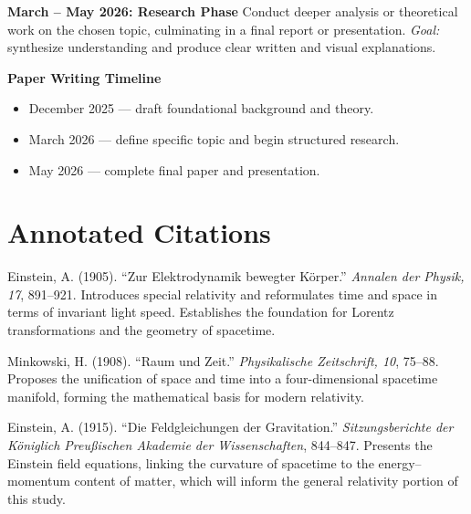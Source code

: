 \documentclass[12pt]{article}
\begin{document}
\textbf{March – May 2026: Research Phase}  
Conduct deeper analysis or theoretical work on the chosen topic, culminating in a final report or presentation.  
\textit{Goal:} synthesize understanding and produce clear written and visual explanations.

\textbf{Paper Writing Timeline}  
\begin{itemize}[leftmargin=2em, itemsep=0.2em]
    \item December 2025 — draft foundational background and theory.
    \item March 2026 — define specific topic and begin structured research.
    \item May 2026 — complete final paper and presentation.
\end{itemize}

\section*{Annotated Citations}

Einstein, A. (1905). “Zur Elektrodynamik bewegter Körper.” \textit{Annalen der Physik, 17}, 891–921.  
Introduces special relativity and reformulates time and space in terms of invariant light speed. Establishes the foundation for Lorentz transformations and the geometry of spacetime.

Minkowski, H. (1908). “Raum und Zeit.” \textit{Physikalische Zeitschrift, 10}, 75–88.  
Proposes the unification of space and time into a four-dimensional spacetime manifold, forming the mathematical basis for modern relativity.

Einstein, A. (1915). “Die Feldgleichungen der Gravitation.” \textit{Sitzungsberichte der Königlich Preußischen Akademie der Wissenschaften}, 844–847.  
Presents the Einstein field equations, linking the curvature of spacetime to the energy–momentum content of matter, which will inform the general relativity portion of this study.
\end{document}
